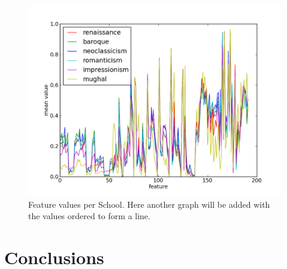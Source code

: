\documentclass[11pt,a4paper,twoside,openright]{report}
\begin{document}
\begin{figure}[tbp]
\centering
\includegraphics[width=\textwidth]{school-graph}
\caption[Feature Values]{Feature values per School. Here another graph will be
added with the values ordered to form a line.}
\label{fig:school}
\end{figure}


%
%
%
%
%
%


\chapter{Conclusions}
\end{document}
